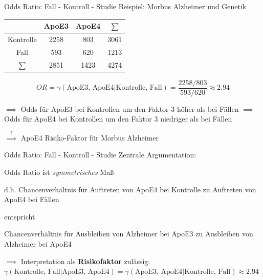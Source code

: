 \documentclass[
  10pt,
  ignorenonframetext,
]{beamer}
\begin{document}
\begin{frame}{Odds Ratio: Fall - Kontroll - Studie}
\label{odds-ratio-fall---kontroll---studie}
Beispiel: Morbus Alzheimer und Genetik

\vspace{0.5cm}

\begin{tabular}{c| cc | c}
  & ApoE3 & ApoE4 & $\sum$ \\ \hline
  Kontrolle & 2258 & 803 & 3061 \\ 
  Fall & 593 & 620 & 1213 \\ \hline
  $\sum$ & 2851 & 1423 & 4274 \\ 
\end{tabular}

\vspace{0.5cm}

\begin{equation*}
  OR = \gamma(\text{ApoE3, ApoE4}|\text{Kontrolle, Fall}) = \frac{2258/803}{593/620} \approx 2.94
\end{equation*}

\vspace{0.5cm}

\(\implies\) Odds für ApoE3 bei Kontrollen um den Faktor 3 höher als bei
Fällen \(\implies\) Odds für ApoE4 bei Kontrollen um den Faktor 3
niedriger als bei Fällen

\vspace{0.3cm}

\(\stackrel{?}{\implies}\) ApoE4 Risiko-Faktor für Morbus Alzheimer
\end{frame}

\begin{frame}{Odds Ratio: Fall - Kontroll - Studie}
\label{odds-ratio-fall---kontroll---studie-1}
Zentrale Argumentation:

\vspace{0.5cm}

Odds Ratio ist \emph{symmetrisches} Maß

d.h. Chancenverhältnis für Auftreten von ApoE4 bei Kontrolle zu
Auftreten von ApoE4 bei Fällen

\vspace{0.2cm}

entspricht \vspace{0.2cm}

Chancenverhältnis für Ausbleiben von Alzheimer bei ApoE3 zu Ausbleiben
von Alzheimer bei ApoE4

\vspace{0.5cm}

\(\implies\) Interpretation als \textbf{Risikofaktor} zulässig:\\
\(\gamma(\text{Kontrolle, Fall}|\text{ApoE3, ApoE4}) = \gamma(\text{ApoE3, ApoE4}|\text{Kontrolle, Fall}) \approx 2.94\)
\end{frame}
\end{document}
